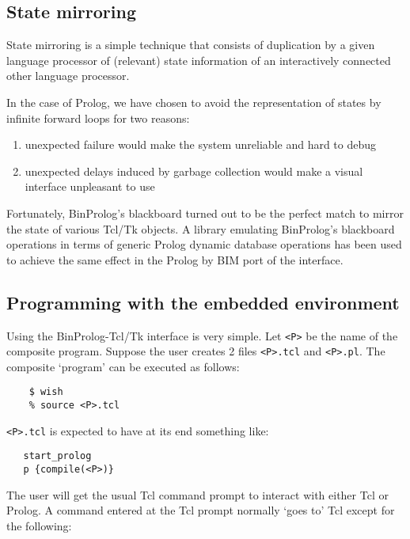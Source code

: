 \documentclass{article}
\begin{document}
\subsection{State mirroring}

State mirroring is a simple technique that consists of
duplication by a given language processor of (relevant)
state information of an interactively connected other
language processor.

In the case of Prolog, we have chosen to avoid the
representation of states by infinite forward loops
for two reasons:

\begin{enumerate}
\item unexpected failure would make the system unreliable
and hard to debug
\item unexpected delays induced by garbage collection would make
a visual interface unpleasant to use
\end{enumerate}

Fortunately, BinProlog's blackboard turned out to be the perfect match
to mirror the state
of various Tcl/Tk objects. A library emulating BinProlog's blackboard
operations in terms of generic Prolog 
dynamic database operations
has been used to achieve
the same effect in the Prolog by BIM port of the interface.
 
\subsection{Programming with the embedded environment}

Using the BinProlog-Tcl/Tk interface is very simple.
Let \verb~<P>~ be the name of the composite program.
Suppose the user creates 2 files \verb~<P>.tcl~ and 
\verb~<P>.pl~. The composite `program' can be executed
as follows:

{\small \begin{verbatim}
    $ wish
    % source <P>.tcl
\end{verbatim}}

{\flushleft \verb~<P>.tcl~ is expected} to have at its end something like:

{\small \begin{verbatim}
   start_prolog
   p {compile(<P>)}
\end{verbatim}}

{\flushleft The} user will get the usual Tcl command prompt to interact with
either Tcl or Prolog. A command entered at the Tcl prompt
normally `goes to' Tcl except for the following: 
\end{document}
